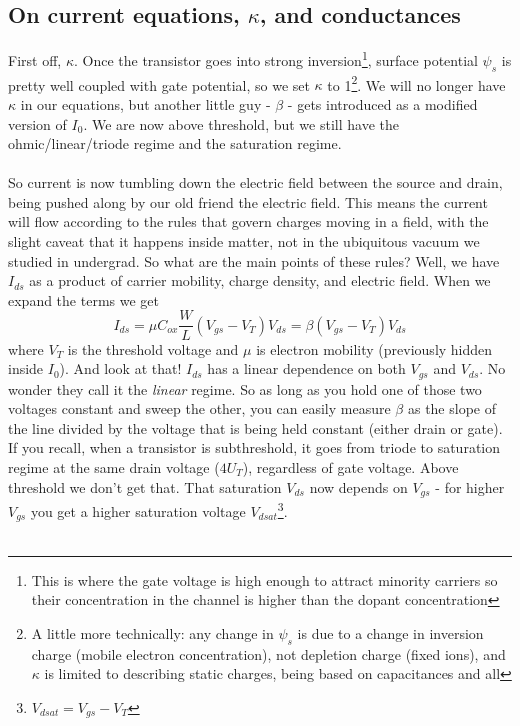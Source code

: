 \documentclass[report]{subfiles}
\begin{document}
\subsection{On current equations, $\kappa$, and conductances}
First off, $\kappa$. Once the transistor goes into strong inversion\footnote{This is where the gate voltage is high enough to attract minority carriers so their concentration in the channel is higher than the dopant concentration}, surface potential $\psi_s$ is pretty well coupled with gate potential, so we set $\kappa$ to 1\footnote{A little more technically: any change in $\psi_s$ is due to a change in inversion charge (mobile electron concentration), not depletion charge (fixed ions), and $\kappa$ is limited to describing static charges, being based on capacitances and all}. We will no longer have $\kappa$ in our equations, but another little guy - $\beta$ - gets introduced as a modified version of $I_0$. We are now above threshold, but we still have the ohmic/linear/triode regime and the saturation regime.\\ \\
So current is now tumbling down the electric field between the source and drain, being pushed along by our old friend the electric field. This means the current will flow according to the rules that govern charges moving in a field, with the slight caveat that it happens inside matter, not in the ubiquitous vacuum we studied in undergrad. So what are the main points of these rules? Well, we have $I_{ds}$ as a product of carrier mobility, charge density, and electric field. When we expand the terms we get
\begin{equation}
I_{ds} = \mu C_{ox}\frac{W}{L}(V_{gs} - V_T)V_{ds} = \beta(V_{gs} - V_T)V_{ds}
\label{abvTriodeEqn}
\end{equation}
where $V_T$ is the threshold voltage and $\mu$ is electron mobility (previously hidden inside $I_0$). And look at that! $I_{ds}$ has a linear dependence on both $V_{gs}$ and $V_{ds}$. No wonder they call it the \emph{linear} regime. So as long as you hold one of those two voltages constant and sweep the other, you can easily measure $\beta$ as the slope of the line divided by the voltage that is being held constant (either drain or gate). If you recall, when a transistor is subthreshold, it goes from triode to saturation regime at the same drain voltage ($4U_T$), regardless of gate voltage. Above threshold we don't get that. That saturation $V_{ds}$ now depends on $V_{gs}$ - for higher $V_{gs}$ you get a higher saturation voltage $V_{dsat}$\footnote{$V_{dsat} = V_{gs} - V_T$}.\\ \\
\end{document}
